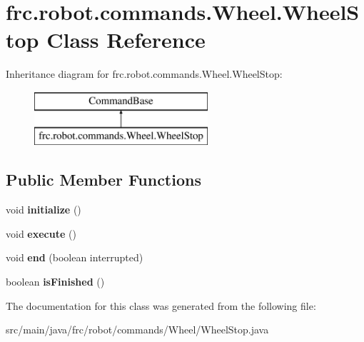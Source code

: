 \hypertarget{classfrc_1_1robot_1_1commands_1_1_wheel_1_1_wheel_stop}{}\section{frc.\+robot.\+commands.\+Wheel.\+Wheel\+Stop Class Reference}
\label{classfrc_1_1robot_1_1commands_1_1_wheel_1_1_wheel_stop}
Inheritance diagram for frc.\+robot.\+commands.\+Wheel.\+Wheel\+Stop\+:\begin{figure}[H]
\begin{center}
\leavevmode
\includegraphics[height=2.000000cm]{classfrc_1_1robot_1_1commands_1_1_wheel_1_1_wheel_stop}
\end{center}
\end{figure}
\subsection*{Public Member Functions}
\begin{DoxyCompactItemize}
\item 
\mbox{\label{classfrc_1_1robot_1_1commands_1_1_wheel_1_1_wheel_stop_a9491ac56ebcca5b8ae50920fa7eab978}} 
void {\bfseries initialize} ()
\item 
\mbox{\label{classfrc_1_1robot_1_1commands_1_1_wheel_1_1_wheel_stop_aade1ac4513ae6bdcf1856f7d93107895}} 
void {\bfseries execute} ()
\item 
\mbox{\label{classfrc_1_1robot_1_1commands_1_1_wheel_1_1_wheel_stop_a1aa347e22974b39c1dd135ce96b42703}} 
void {\bfseries end} (boolean interrupted)
\item 
\mbox{\label{classfrc_1_1robot_1_1commands_1_1_wheel_1_1_wheel_stop_ada85a1b57ba96e31705c2dde4edcb23b}} 
boolean {\bfseries is\+Finished} ()
\end{DoxyCompactItemize}


The documentation for this class was generated from the following file\+:\begin{DoxyCompactItemize}
\item 
src/main/java/frc/robot/commands/\+Wheel/Wheel\+Stop.\+java\end{DoxyCompactItemize}
